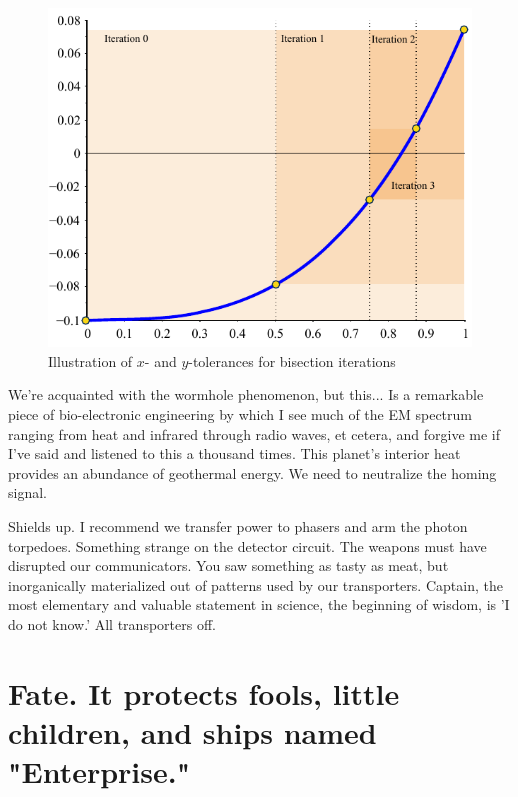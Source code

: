 \begin{figure}
 \begin{center}
  \includegraphics[scale=1]{./figures/f1_tol.pdf}
 \end{center}
 \caption{ \label{fig:fn:tol}
  Illustration of $x$- and $y$-tolerances for bisection iterations}
\end{figure}

We're acquainted with the wormhole phenomenon, but this... Is a remarkable piece of bio-electronic engineering by which I see much of the EM spectrum ranging from heat and infrared through radio waves, et cetera, and forgive me if I've said and listened to this a thousand times. This planet's interior heat provides an abundance of geothermal energy. We need to neutralize the homing signal.

Shields up. I recommend we transfer power to phasers and arm the photon torpedoes. Something strange on the detector circuit. The weapons must have disrupted our communicators. You saw something as tasty as meat, but inorganically materialized out of patterns used by our transporters. Captain, the most elementary and valuable statement in science, the beginning of wisdom, is 'I do not know.' All transporters off.

\section{Fate. It protects fools, little children, and ships named "Enterprise."}

